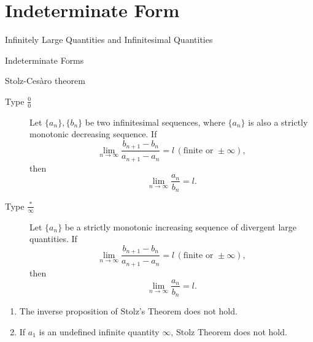 \documentclass[11pt]{../../TexTemplate/elegantbook}
\begin{document}
\section{Indeterminate Form}
\begin{leftbarTitle}{Infinitely Large Quantities and Infinitesimal Quantities}\end{leftbarTitle}

\begin{leftbarTitle}{Indeterminate Forms}\end{leftbarTitle}

\begin{theorem}{Stolz-Cesàro theorem}\label{thm:Stolz Theorem}
    \begin{description}
        \item[Type \(\frac{0}{0}\)] Let \(\{a_n\}, \{b_n\}\) be two infinitesimal sequences, 
            where \(\{a_n\}\) is also a strictly monotonic decreasing sequence. If  
            \[
            \lim_{n \to \infty} \frac{b_{n+1} - b_n}{a_{n+1} - a_n} = l \, (\text{finite or } \pm\infty),
            \]  
            then  
            \[
            \lim_{n \to \infty} \frac{a_n}{b_n} = l.
            \] 
        \item[Type \(\frac{\text{*}}{\infty}\)] Let \(\{a_n\}\) be a strictly monotonic increasing sequence 
            of divergent large quantities. If  
            \[
            \lim_{n \to \infty} \frac{b_{n+1} - b_n}{a_{n+1} - a_n} = l \, (\text{finite or } \pm\infty),
            \]  
            then  
            \[
            \lim_{n \to \infty} \frac{a_n}{b_n} = l.
            \]
    \end{description}
\end{theorem}
\begin{note}
    \begin{enumerate}
        \item The inverse proposition of Stolz's Theorem does not hold.
        \item If \(a_1\) is an undefined infinite quantity \(\infty\), Stolz Theorem does not hold.
    \end{enumerate}
\end{note}
\end{document}
